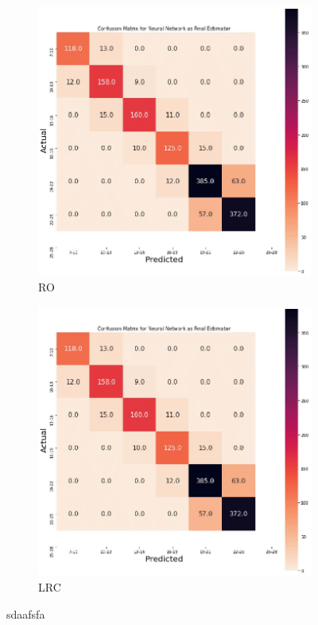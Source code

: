 \begin{figure}[hbt!]
\medskip %
\begin{subfigure}{.475\linewidth}
  \includegraphics[trim={0 0 0 0.72cm},clip,width=\linewidth]{gorseller/Confusion-Matrix.png}
  \caption{RO}
  \label{velcomp1}
\end{subfigure}\hfill %
\begin{subfigure}{.475\linewidth}
  \includegraphics[trim={0 0 0 0.72cm},clip,width=\linewidth]{gorseller/Confusion-Matrix.png}
  \caption{LRC}
  \label{estcomp1}
\end{subfigure}

\caption{sdaafsfa}
\label{fig:cksffsgeoall}
\end{figure}


